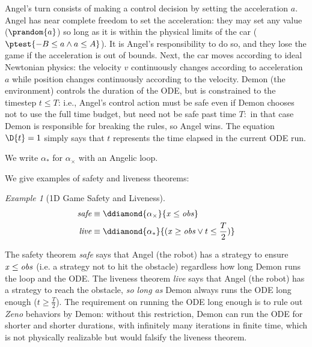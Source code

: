 \documentclass[12pt]{cmuthesis}
\theoremstyle{definition}
\theoremstyle{remark}
\newtheorem{example}{Example}
\begin{document}
Angel's turn consists of making a control decision by setting the acceleration $a$.
Angel has near complete freedom to set the acceleration: they may set any value ($\prandom{a}$) so long as it is within the physical limits of the car ($\ptest{-B \leq a \land a \leq A}$).
It is Angel's responsibility to do so, and they lose the game if the acceleration is out of bounds.
Next, the car moves according to ideal Newtonian physics: the velocity $v$ continuously changes according to acceleration $a$ while position changes continuously according to the velocity.
Demon (the environment) controls the duration of the ODE, but is constrained to the timestep $t \leq T$: i.e., Angel's control action must be safe even if Demon chooses not to use the full time budget, but need not be safe past time $T:$ in that case Demon is responsible for breaking the rules, so Angel wins.
The equation $\D{t}=1$ simply says that $t$ represents the time elapsed in the current ODE run.

We write $\alpha_*$ for $\alpha_\times$ with an Angelic loop.

We give examples of safety and liveness theorems:
\begin{example}[1D Game Safety and Liveness]
  \begin{align*}
    \textit{safe} &\equiv \ddiamond{\alpha_\times}{\xvar \leq \obsvar}\\
    \textit{live} &\equiv \ddiamond{\alpha_*}{(\xvar \geq \obsvar \lor t \leq \frac{T}{2})}
  \end{align*}
\end{example}
The safety theorem \emph{safe} says that Angel (the robot) has a strategy to ensure ${\it x} \leq {\it obs}$ (i.e. a strategy not to hit the obstacle) regardless how long Demon runs the loop and the ODE.
The liveness theorem \emph{live} says that Angel (the robot) has a strategy to reach the obstacle, \emph{so long as} Demon always runs the ODE long enough ($t \geq \frac{T}{2}$).
The requirement on running the ODE long enough is to rule out \emph{Zeno} behaviors by Demon: without this restriction, Demon can run the ODE for shorter and shorter durations, with infinitely many iterations in finite time, which is not physically realizable but would falsify the liveness theorem.
 
\end{document}
